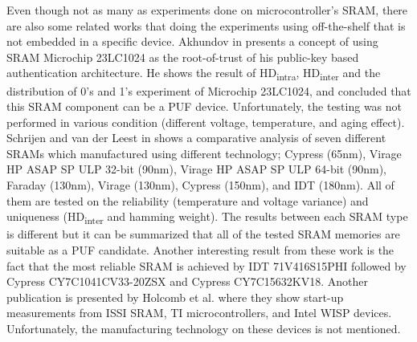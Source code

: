 Even though not as many as experiments done on microcontroller's SRAM, there are also some related works that doing the experiments using off-the-shelf that is not embedded in a specific device. Akhundov in \cite{haji} presents a concept of using SRAM Microchip 23LC1024 as the root-of-trust of his public-key based authentication architecture. He shows the result of HD\textsubscript{intra}, HD\textsubscript{inter} and the distribution of 0's and 1's experiment of Microchip 23LC1024, and concluded that this SRAM component can be a PUF device. Unfortunately, the testing was not performed in various condition (different voltage, temperature, and aging effect).
Schrijen and van der Leest in \cite{Schrijen:2012:CAS:2492708.2493033} shows a comparative analysis of seven different SRAMs which manufactured using different technology; Cypress  (65nm),
Virage HP ASAP SP ULP 32-bit (90nm), Virage HP ASAP SP ULP 64-bit (90nm), Faraday  (130nm), Virage  (130nm), Cypress  (150nm), and IDT  (180nm). All of them are tested on the reliability (temperature and voltage variance) and uniqueness (HD\textsubscript{inter} and hamming weight). The results between each SRAM type is different but it can be summarized that all of the tested SRAM memories are suitable as a PUF candidate. Another interesting result from these work is the fact that the most reliable SRAM is achieved by IDT 71V416S15PHI followed by Cypress CY7C1041CV33-20ZSX and Cypress CY7C15632KV18.
Another publication is presented by Holcomb et al. \cite{4674345} where they show start-up measurements from ISSI SRAM, TI microcontrollers, and Intel WISP devices. Unfortunately, the manufacturing technology on these devices is not mentioned.
